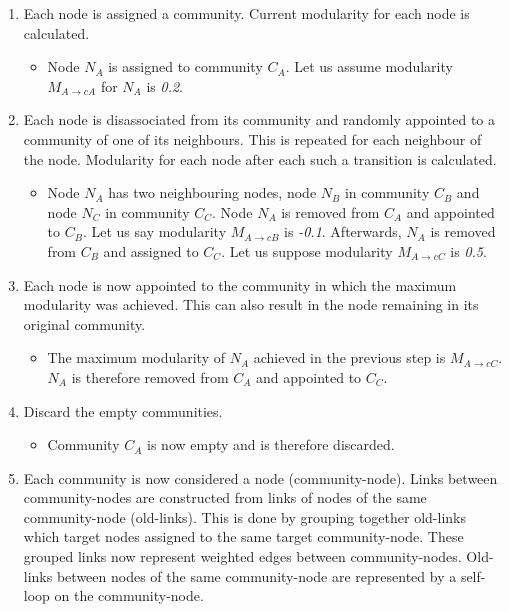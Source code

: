 \begin{enumerate} [label=\alph*)]
  \label{louvainAlgorithmPrinciple}
  \item  Each node is assigned a community. Current modularity for each node is calculated. 
  \label{LA1}
  \begin{itemize}
    \item Node $N_{A}$ is assigned to community $C_{A}$. Let us assume modularity $M_{A\rightarrow cA}$ for $N_{A}$ is \textit{0.2}.
  \end{itemize} 
  \item Each node is disassociated from its community and randomly appointed to a community of one of its neighbours. This is repeated for each neighbour of the node. Modularity for each node after each such a transition is calculated.
  \label{LA2}
  \begin{itemize}
    \item Node $N_{A}$ has two neighbouring nodes, node $N_{B}$ in community $C_{B}$ and node $N_{C}$ in community $C_{C}$. Node $N_{A}$ is removed from $C_{A}$ and appointed to $C_{B}$. Let us say modularity $M_{A\rightarrow cB}$ is \textit{-0.1}. Afterwards, $N_{A}$ is removed from $C_{B}$ and assigned to $C_{C}$. Let us suppose modularity $M_{A\rightarrow cC}$ is \textit{0.5}. 
  \end{itemize} 
  \item Each node is now appointed to the community in which the maximum modularity was achieved. This can also result in the node remaining in its original community.
  \label{LA3}
  \begin{itemize}
    \item The maximum modularity of $N_{A}$ achieved in the previous step is $M_{A\rightarrow cC}$. $N_{A}$ is therefore removed from $C_{A}$ and appointed to $C_{C}$.
  \end{itemize} 
  \item Discard the empty communities. 
  \label{LA4}
  \begin{itemize}
    \item Community $C_{A}$ is now empty and is therefore discarded.
  \end{itemize} 
  \item Each community is now considered a node (community-node). Links between community-nodes are constructed from links of nodes of the same community-node (old-links). This is done by grouping together old-links which target nodes assigned to the same target community-node. These grouped links now represent weighted edges between community-nodes. Old-links between nodes of the same community-node are represented  by a self-loop on the community-node.

\end{enumerate}

